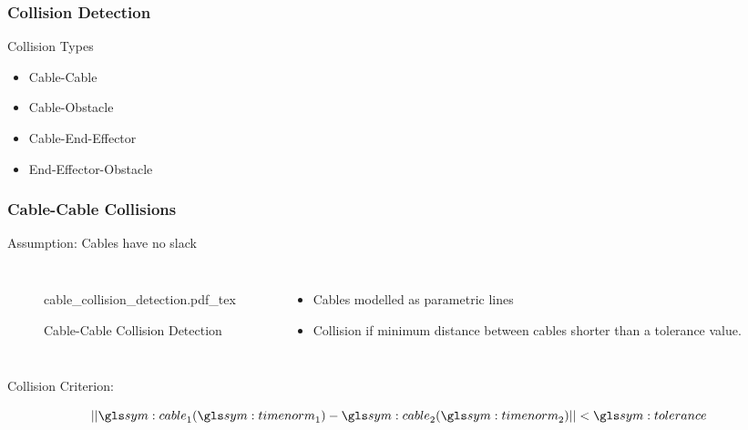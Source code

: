 \begin{frame}
	\frametitle{Collision Detection}

	Collision Types

	\begin{itemize}

		\item

			Cable-Cable

		\item

			Cable-Obstacle

		\item

			Cable-End-Effector

		\item

			End-Effector-Obstacle
	\end{itemize}

\end{frame}

\begin{frame}
	\frametitle{Cable-Cable Collisions}

	Assumption: Cables have no slack

	\begin{columns}
			\begin{figure}[hb]
				\centering
				\def\svgwidth{\columnwidth}
				{cable_collision_detection.pdf_tex}
				\caption{Cable-Cable Collision Detection}
				\label{fig:cable_cable_collision_detection}
			\end{figure}

			\begin{itemize}

				\item

					Cables modelled as parametric lines

				\item

					Collision if minimum distance between cables shorter than a
					tolerance value.

			\end{itemize}
	\end{columns}

	Collision Criterion:

	\begin{equation*}
		\norm{\cable_1(\timenorm_1) - \cable_2(\timenorm_2)} < \tol
	\end{equation*}

\end{frame}

